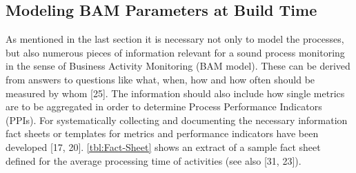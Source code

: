 \subsection{Modeling BAM Parameters at Build Time}
As mentioned in the last section it is necessary not only to model the processes, but also numerous pieces of information relevant for a sound process monitoring in the sense of Business Activity Monitoring (BAM model). These can be derived from answers to questions like what, when, how and how often should be measured by whom [25]. The information should also include how single metrics are to be aggregated in order to determine Process Performance Indicators (PPIs). For systematically collecting and documenting the necessary information fact sheets or templates for metrics and performance indicators have been developed [17, 20]. \ref{tbl:Fact-Sheet}  shows an extract of a sample fact sheet defined for the average processing time of activities (see also [31, 23]).


